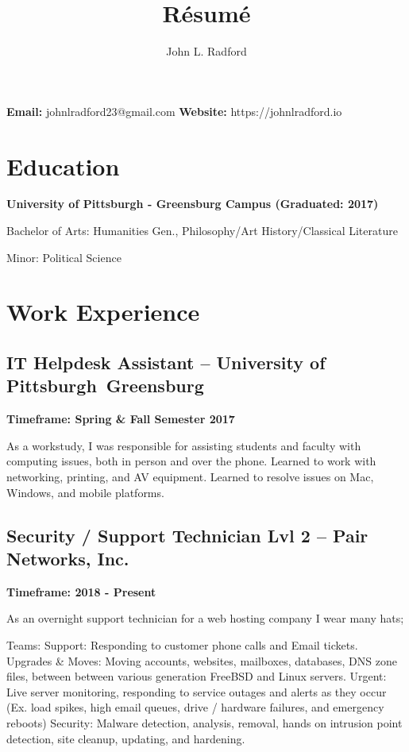 \documentclass{article}
\makeatletter
\renewcommand{\maketitle}{
\begin{flushleft}
{\huge\bfseries
\theauthor}

\vspace{.25em}
\textbf{Email:} johnlradford23@gmail.com
\textbf{Website:} https://johnlradford.io 
\end{flushleft}
}
\makeatother
\begin{document}
\title{R\'esum\'e}
\author{John L. Radford}

\maketitle

\section{Education}

\noindent
\textbf{University of Pittsburgh - Greensburg Campus (Graduated: 2017)}

Bachelor of Arts: Humanities Gen., Philosophy/Art History/Classical Literature

Minor: Political Science

\section{Work Experience}

\subsection{IT Helpdesk Assistant -- University of Pittsburgh Greensburg}

\noindent
\textbf{Timeframe: Spring \& Fall Semester 2017}

As a workstudy, I was responsible for assisting students and faculty with
computing issues, both in person and over the phone. Learned to work with
networking, printing, and AV equipment. Learned to resolve issues on Mac,
Windows, and mobile platforms.

\subsection{Security / Support Technician Lvl 2 -- Pair Networks, Inc.}

\noindent
\textbf{Timeframe: 2018 - Present}

As an overnight support technician for a web hosting company I wear many hats; 

Teams:
      Support: Responding to customer phone calls and Email tickets.
      Upgrades \& Moves: Moving accounts, websites, mailboxes, databases, DNS zone files, between between various generation FreeBSD and Linux servers.
      Urgent: Live server monitoring, responding to service outages and alerts as they occur (Ex. load spikes, high email queues, drive / hardware failures, and emergency reboots)
      Security: Malware detection, analysis, removal, hands on intrusion point detection, site cleanup, updating, and hardening.
\end{document}
